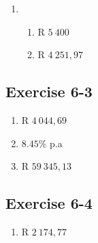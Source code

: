 \begin{enumerate}[label=\textbf{\arabic*}., itemsep=5pt]
\begin{enumerate}[label=\textbf{\arabic*}.]
	\item %
	\begin{enumerate}[noitemsep, label=\textbf{(\alph*)} ]
	    \item R $5~ 400$%
	    \item R $4 ~251,97$%
	\end{enumerate}
    \end{enumerate}
\subsection{Exercise 6-3} %
    \begin{enumerate}[label=\textbf{\arabic*}.]
	\item R $4 ~044,69$%

	\item $8.45\%$ p.a%

	\item R $59 ~345,13$%
    \end{enumerate}

\subsection{Exercise 6-4} %
    \begin{enumerate}[label=\textbf{\arabic*}.]
	\item R $2~ 174,77$%


\end{enumerate}
\end{enumerate}
